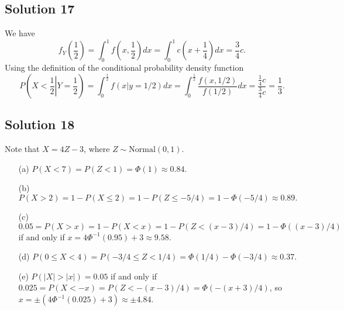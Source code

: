 \subsection*{Solution 17}

We have
\begin{equation*}
    f_Y\left(\frac{1}{2}\right) = \int_0^1 f\left(x, \frac{1}{2}\right) dx = \int_0^1 c\left(x + \frac{1}{4}\right) dx = \frac{3}{4}c.
\end{equation*}
Using the definition of the conditional probability density function
\begin{equation*}
    P\left(X < \frac{1}{2} \left| Y = \frac{1}{2} \right.\right)
        = \int_0^{\frac{1}{2}} f(x | y = 1/2) dx
        = \int_0^{\frac{1}{2}} \frac{f(x, 1/2)}{f(1/2)} dx
        = \frac{\frac{1}{4}c}{\frac{3}{4}c}
        = \frac{1}{3}.
\end{equation*}


\subsection*{Solution 18}

Note that $X = 4Z - 3$, where $Z \sim \mathrm{Normal}(0, 1)$.
\begin{itemize}
    \item[(a)] $P(X < 7) = P(Z < 1) = \Phi(1) \approx 0.84$.
    \item[(b)] $P(X > 2) = 1 - P(X \leq 2) = 1 - P(Z \leq -5/4) = 1 - \Phi(-5/4) \approx 0.89.$
    \item[(c)] $0.05 = P(X > x) = 1 - P(X < x) = 1 - P(Z < (x - 3)/4) = 1 - \Phi((x - 3)/4)$ if and only if $x = 4 \Phi^{-1}(0.95) + 3 \approx 9.58$.
    \item[(d)] $P(0 \leq X < 4) = P(-3/4 \leq Z < 1/4) = \Phi(1/4) - \Phi(-3/4) \approx 0.37$.
    \item[(e)] $P(|X| > |x|) = 0.05$ if and only if $0.025 = P(X < -x) = P(Z < -(x - 3)/4) = \Phi(-(x + 3)/4)$, so $x = \pm (4\Phi^{-1}(0.025) + 3) \approx \pm 4.84$.
\end{itemize}
